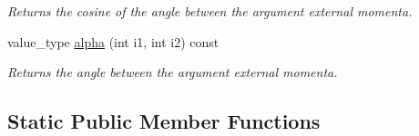 \begin{DoxyCompactItemize}
\begin{DoxyCompactList}\small\item\em Returns the cosine of the angle between the argument external momenta. \end{DoxyCompactList}\item 
\hypertarget{a00442_a3d3dfd9f1aed794d5c6b57b877de5beb}{value\-\_\-type \hyperlink{a00442_a3d3dfd9f1aed794d5c6b57b877de5beb}{alpha} (int i1, int i2) const }\label{a00442_a3d3dfd9f1aed794d5c6b57b877de5beb}

\begin{DoxyCompactList}\small\item\em Returns the angle between the argument external momenta. \end{DoxyCompactList}\end{DoxyCompactItemize}
\subsection*{Static Public Member Functions}

